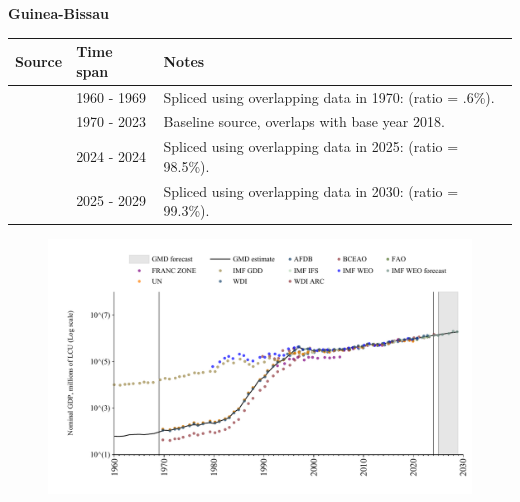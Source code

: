 \documentclass[12pt,a4paper,landscape]{article}
\begin{document}
\begin{adjustbox}{max totalsize={\paperwidth}{\paperheight},center}
\begin{minipage}[t][\textheight][t]{\textwidth}
\vspace*{0.5cm}
{}
\begin{center}
{\Large\bfseries Guinea-Bissau}
\end{center}
\vspace{0.5cm}
\begin{table}[H]
\centering
\small
\begin{tabular}{|l|l|l|}
\hline
\textbf{Source} & \textbf{Time span} & \textbf{Notes} \\
\hline
\rowcolor{white}\cite{IMF_GDD}& 1960 - 1969 &Spliced using overlapping data in 1970: (ratio = .6\%).\\
\rowcolor{lightgray}\cite{WDI}& 1970 - 2023 &Baseline source, overlaps with base year 2018.\\
\rowcolor{white}\cite{BCEAO}& 2024 - 2024 &Spliced using overlapping data in 2025: (ratio = 98.5\%).\\
\rowcolor{lightgray}\cite{IMF_WEO_forecast}& 2025 - 2029 &Spliced using overlapping data in 2030: (ratio = 99.3\%).\\
\hline
\end{tabular}
\end{table}
\begin{figure}[H]
\centering
\includegraphics[width=\textwidth,height=0.6\textheight,keepaspectratio]{graphs/GNB_nGDP.pdf}
\end{figure}
\end{minipage}
\end{adjustbox}
\end{document}
